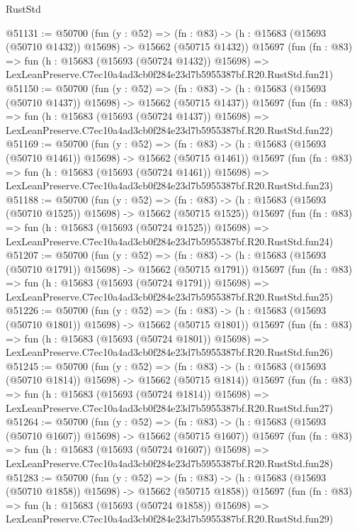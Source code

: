 \begin{lexlean}{RustStd}
\begin{coremodule}
@51131 := @50700
    (fun (y : @52) =>
    (fn : @83) -> (h : @15683 (@15693 (@50710 @1432)) @15698) -> @15662 (@50715 @1432))
    @15697
    (fun (fn : @83) =>
    fun (h : @15683 (@15693 (@50724 @1432)) @15698) =>
    LexLeanPreserve.C7ec10a4ad3cb0f284e23d7b5955387bf.R20.RustStd.fun21)
@51150 := @50700
    (fun (y : @52) =>
    (fn : @83) -> (h : @15683 (@15693 (@50710 @1437)) @15698) -> @15662 (@50715 @1437))
    @15697
    (fun (fn : @83) =>
    fun (h : @15683 (@15693 (@50724 @1437)) @15698) =>
    LexLeanPreserve.C7ec10a4ad3cb0f284e23d7b5955387bf.R20.RustStd.fun22)
@51169 := @50700
    (fun (y : @52) =>
    (fn : @83) -> (h : @15683 (@15693 (@50710 @1461)) @15698) -> @15662 (@50715 @1461))
    @15697
    (fun (fn : @83) =>
    fun (h : @15683 (@15693 (@50724 @1461)) @15698) =>
    LexLeanPreserve.C7ec10a4ad3cb0f284e23d7b5955387bf.R20.RustStd.fun23)
@51188 := @50700
    (fun (y : @52) =>
    (fn : @83) -> (h : @15683 (@15693 (@50710 @1525)) @15698) -> @15662 (@50715 @1525))
    @15697
    (fun (fn : @83) =>
    fun (h : @15683 (@15693 (@50724 @1525)) @15698) =>
    LexLeanPreserve.C7ec10a4ad3cb0f284e23d7b5955387bf.R20.RustStd.fun24)
@51207 := @50700
    (fun (y : @52) =>
    (fn : @83) -> (h : @15683 (@15693 (@50710 @1791)) @15698) -> @15662 (@50715 @1791))
    @15697
    (fun (fn : @83) =>
    fun (h : @15683 (@15693 (@50724 @1791)) @15698) =>
    LexLeanPreserve.C7ec10a4ad3cb0f284e23d7b5955387bf.R20.RustStd.fun25)
@51226 := @50700
    (fun (y : @52) =>
    (fn : @83) -> (h : @15683 (@15693 (@50710 @1801)) @15698) -> @15662 (@50715 @1801))
    @15697
    (fun (fn : @83) =>
    fun (h : @15683 (@15693 (@50724 @1801)) @15698) =>
    LexLeanPreserve.C7ec10a4ad3cb0f284e23d7b5955387bf.R20.RustStd.fun26)
@51245 := @50700
    (fun (y : @52) =>
    (fn : @83) -> (h : @15683 (@15693 (@50710 @1814)) @15698) -> @15662 (@50715 @1814))
    @15697
    (fun (fn : @83) =>
    fun (h : @15683 (@15693 (@50724 @1814)) @15698) =>
    LexLeanPreserve.C7ec10a4ad3cb0f284e23d7b5955387bf.R20.RustStd.fun27)
@51264 := @50700
    (fun (y : @52) =>
    (fn : @83) -> (h : @15683 (@15693 (@50710 @1607)) @15698) -> @15662 (@50715 @1607))
    @15697
    (fun (fn : @83) =>
    fun (h : @15683 (@15693 (@50724 @1607)) @15698) =>
    LexLeanPreserve.C7ec10a4ad3cb0f284e23d7b5955387bf.R20.RustStd.fun28)
@51283 := @50700
    (fun (y : @52) =>
    (fn : @83) -> (h : @15683 (@15693 (@50710 @1858)) @15698) -> @15662 (@50715 @1858))
    @15697
    (fun (fn : @83) =>
    fun (h : @15683 (@15693 (@50724 @1858)) @15698) =>
    LexLeanPreserve.C7ec10a4ad3cb0f284e23d7b5955387bf.R20.RustStd.fun29)

\end{coremodule}
\end{lexlean}
